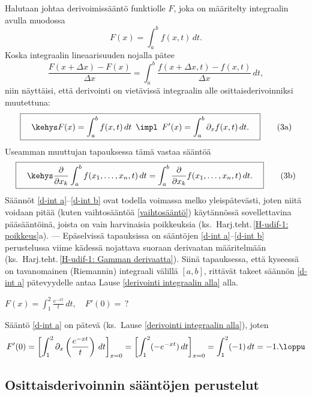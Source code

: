 Halutaan johtaa derivoimissääntö funktiolle $F$, joka on määritelty integraalin avulla muodossa
\[
F(x) = \int_a^b f(x,t)\,dt.
\]
Koska integraalin lineaarisuuden nojalla pätee
\[
\frac{F(x+\Delta x)-F(x)}{\Delta x} = \int_a^b \frac{f(x+\Delta x,t)-f(x,t)}{\Delta x}\,dt,
\]
niin näyttäisi, että derivointi on vietävissä integraalin alle osittaisderivoinniksi 
muutettuna:
\begin{equation} \label{d-int a}
\boxed{\quad\kehys F(x) =\int_a^b f(x,t)\,dt\,\ \impl\,\ 
                   F'(x)=\int_a^b \partial_x f(x,t)\,dt. \quad} \tag{3a}
\end{equation}
Useamman muuttujan tapauksessa tämä vastaa sääntöä
\begin{equation} \label{d-int b}
\boxed{\quad\kehys \frac{\partial}{\partial x_k}\int_a^b f(x_1,\ldots,x_n,t)\,dt 
              = \int_a^b \frac{\partial}{\partial x_k}f(x_1,\ldots,x_n,t)\,dt. \quad} \tag{3b}
\end{equation}
Säännöt \eqref{d-int a}--\eqref{d-int b} ovat todella voimassa melko yleispätevästi, joten
niitä voidaan pitää (kuten vaihtosääntöä \eqref{vaihtosääntö}) käytännössä sovellettavina
pääsääntöinä, joista on vain harvinaisia poikkeuksia 
(ks.\ Harj.teht.\,\ref{H-udif-1: poikkeus}a). --- Epäselvissä tapauksissa on sääntöjen
\eqref{d-int a}--\eqref{d-int b} perustelussa viime kädessä nojattava suoraan derivaatan
määritelmään (ks.\ Harj.teht.\,\ref{H-udif-1: Gamman derivaatta}). Siinä tapauksessa, että
kyseessä on tavanomainen (Riemannin) integraali välillä $[a,b]$, rittävät takeet säännön
\eqref{d-int a} pätevyydelle antaa Lause \ref{derivointi integraalin alla} alla.
\begin{Exa} $\displaystyle{F(x)=\int_1^2 \frac{e^{-xt}}{t}\,dt, \quad F'(0)=\,?}$ 
\end{Exa}
\ratk Sääntö \eqref{d-int a} on pätevä (ks.\ Lause \ref{derivointi integraalin alla}), joten
\[
F'(0)= \left[\int_1^2 \partial_x\left(\frac{e^{-xt}}{t}\right)\,dt\right]_{x=0} 
     = \left[\int_1^2(-e^{-xt})\,dt\right]_{x=0} = \int_1^2 (-1)\,dt = -1. \loppu
\]

\subsection*{Osittaisderivoinnin sääntöjen perustelut}

